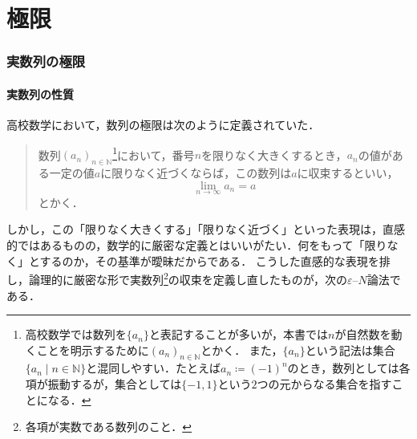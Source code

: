 \part{極限}

\begin{abstract}
この章では，実数列の極限を厳密に定義し，その基本性質を確認する．高校で数列の極限を定義する際に用いた「限りなく近づく」という表現は，厳密な議論を行ううえでは曖昧さを残すものである．そこでまず，この表現を論理的に厳密な形に定義し直した$\varepsilon$--$N$論法を導入し，実数列の収束と発散を定義する．次に，数列を自然数全体から実数全体への写像として捉え直し，極限の一意性を証明する．そのうえで，極限の四則演算や，極限操作が順序関係を保存することを示し，数列の収束を判定する強力な手法である「はさみうちの原理」を具体例とともに確認しよう．ここで扱う議論は，で「実数の連続性」を数学的に記述するための準備にもなる．
\end{abstract}

\section{実数列の極限}\label{sec:実数列の極限}

\subsection{実数列の性質}

高校数学において，数列の極限は次のように定義されていた．

\begin{quotation}
  数列$(a_n)_{n \in \mathbb{N}}$\footnote{高校数学では数列を$\{a_n\}$と表記することが多いが，本書では$n$が自然数を動くことを明示するために$(a_n)_{n \in \mathbb{N}}$とかく．
  また，$\{a_n\}$という記法は集合$\{ a_n \mid n \in \mathbb{N} \}$と混同しやすい．たとえば$a_n \coloneqq (-1)^n$のとき，数列としては各項が振動するが，集合としては$\{ -1, 1 \}$という$2$つの元からなる集合を指すことになる．}において，番号$n$を限りなく大きくするとき，$a_n$の値がある一定の値$a$に限りなく近づくならば，この数列は$a$に収束するといい，
  \[
    \lim_{n \to \infty} a_n = a
  \]
  とかく．
\end{quotation}

しかし，この「限りなく大きくする」「限りなく近づく」といった表現は，直感的ではあるものの，数学的に厳密な定義とはいいがたい．何をもって「限りなく」とするのか，その基準が曖昧だからである．
こうした直感的な表現を排し，論理的に厳密な形で実数列\footnote{各項が実数である数列のこと．}の収束を定義し直したものが，次の$\varepsilon$--$N$論法である．

